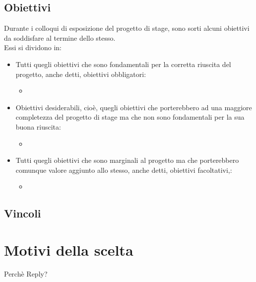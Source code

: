 \subsection{Obiettivi}
Durante i colloqui di esposizione del progetto di stage, sono sorti alcuni obiettivi da soddisfare al termine dello stesso.\\
Essi si dividono in:
\begin{itemize}
	\item Tutti quegli obiettivi che sono fondamentali per la corretta riuscita del progetto, anche detti, obiettivi obbligatori:
	\begin{itemize}
		\item 
	\end{itemize}
	\item Obiettivi desiderabili, cioè, quegli obiettivi che porterebbero ad una maggiore completezza del progetto di stage ma che non sono fondamentali per la sua buona riuscita:
		\begin{itemize}
		\item 
		\end{itemize}	
	\item Tutti quegli obiettivi che sono marginali al progetto ma che porterebbero comunque valore aggiunto allo stesso, anche detti, obiettivi facoltativi,:
	\begin{itemize}
		\item 
	\end{itemize}
\end{itemize}

\subsection{Vincoli}
\section{Motivi della scelta}
Perchè Reply?